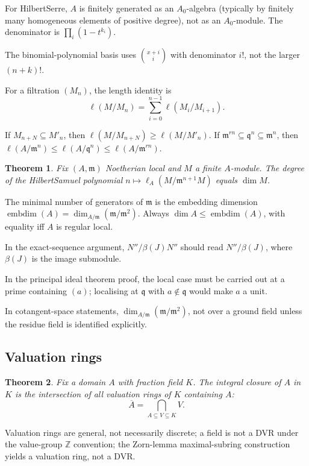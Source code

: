\documentclass[12pt]{article}
\theoremstyle{plain}
\newtheorem{thm}{Theorem}[subsection] %
\theoremstyle{definition}
\begin{document}
For Hilbert\textendash Serre, $A$ is finitely generated as an $A_0$-algebra (typically by finitely many homogeneous elements of positive degree), not as an $A_0$-module. The denominator is $\prod_i(1-t^{k_i})$.

The binomial-polynomial basis uses $\binom{x+i}{i}$ with denominator $i!$, not the larger $(n+k)!$.

For a filtration $(M_n)$, the length identity is
\[
\ell(M/M_n)=\sum_{i=0}^{n-1}\ell(M_i/M_{i+1}).
\]

If $M_{n+N}\subseteq M'_n$, then $\ell(M/M_{n+N})\ge\ell(M/M'_n)$. If $\mathfrak{m}^{rn}\subseteq\mathfrak{q}^n\subseteq\mathfrak{m}^n$, then $\ell(A/\mathfrak{m}^n)\le\ell(A/\mathfrak{q}^n)\le\ell(A/\mathfrak{m}^{rn})$.

\begin{thm}
Fix $(A,\mathfrak{m})$ Noetherian local and $M$ a finite $A$-module. The degree of the Hilbert\textendash Samuel polynomial $n\mapsto\ell_A(M/\mathfrak{m}^{n+1}M)$ equals $\dim M$.
\end{thm}

The minimal number of generators of $\mathfrak{m}$ is the embedding dimension $\operatorname{embdim}(A)=\dim_{A/\mathfrak{m}}(\mathfrak{m}/\mathfrak{m}^2)$. Always $\dim A\le\operatorname{embdim}(A)$, with equality iff $A$ is regular local.

In the exact-sequence argument, $N''/\beta(J)N''$ should read $N''/\beta(J)$, where $\beta(J)$ is the image submodule.

In the principal ideal theorem proof, the local case must be carried out at a prime containing $(a)$; localising at $\mathfrak{q}$ with $a\notin\mathfrak{q}$ would make $a$ a unit.

In cotangent-space statements, $\dim_{A/\mathfrak{m}}(\mathfrak{m}/\mathfrak{m}^2)$, not over a ground field unless the residue field is identified explicitly.

\subsection{Valuation rings}

\begin{thm}
Fix a domain $A$ with fraction field $K$. The integral closure of $A$ in $K$ is the intersection of all valuation rings of $K$ containing $A$:
\[
\overline{A}=\bigcap_{A\subseteq V\subseteq K}V.
\]
\end{thm}

Valuation rings are general, not necessarily discrete; a field is not a DVR under the value-group $\mathbb{Z}$ convention; the Zorn-lemma maximal-subring construction yields a valuation ring, not a DVR.
\end{document}
